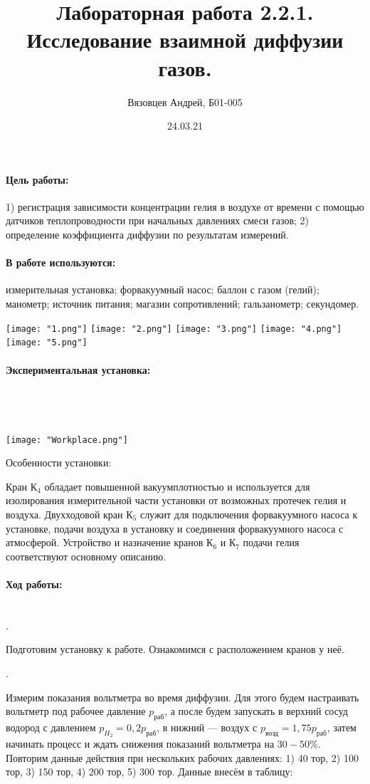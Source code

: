 \documentclass[a4paper, 12pt]{article}
\author{Вязовцев Андрей, Б01-005}
\date{24.03.21}
\title{Лабораторная работа 2.2.1. Исследование взаимной диффузии газов.}
\newcommand{\parag}[1]{\paragraph*{#1:}}
\newcounter{Points}
\newcommand{\point}{\arabic{Points}. \addtocounter{Points}{1}}
\begin{document}
\maketitle

\newpage

\parag {Цель работы}
1) регистрация зависимости концентрации гелия в воздухе от времени с помощью датчиков теплопроводности при начальных давлениях смеси газов; 2) определение коэффициента диффузии по результатам измерений.

\parag {В работе используются}
измерительная установка; форвакуумный насос; баллон с газом (гелий); манометр; источник питания; магазин сопротивлений; гальзанометр; секундомер.


\texttt{[image: "1.png"]}
\newpage
\texttt{[image: "2.png"]}
\newpage
\texttt{[image: "3.png"]}
\newpage
\texttt{[image: "4.png"]}
\newpage
\texttt{[image: "5.png"]}

\parag{Экспериментальная установка} ~\\ \\ \\
\texttt{[image: "Workplace.png"]}

Особенности установки:

Кран $К_4$ обладает повышенной вакуумплотностью и используется для изолирования измерительной части установки от возможных протечек гелия и воздуха. Двухходовой кран $К_5$ служит для подключения форвакуумного насоса к установке, подачи воздуха в установку и соединения форвакуумного насоса с атмосферой. Устройство и назначение кранов $К_6$ и $К_7$ подачи гелия соответствуют основному описанию.
\newpage

\parag {Ход работы} ~\\

\point Подготовим установку к работе. Ознакомимся с расположением кранов у неё.

\point Измерим показания вольтметра во время диффузии. Для этого будем настраивать вольтметр под рабочее давление $p_{\text{раб}}$, а после будем запускать в верхний сосуд водород с давлением $p_{H_2} = 0,2 p_{\text{раб}}$, в нижний --- воздух с $p_{\text{возд}} = 1,75 p_{\text{раб}}$, затем начинать процесс и ждать снижения показаний вольтметра на $30-50\%$. Повторим данные действия при нескольких рабочих давлениях: 1) 40 тор, 2) 100 тор, 3) 150 тор, 4) 200 тор, 5) 300 тор. Данные внесём в таблицу:
\end{document}
